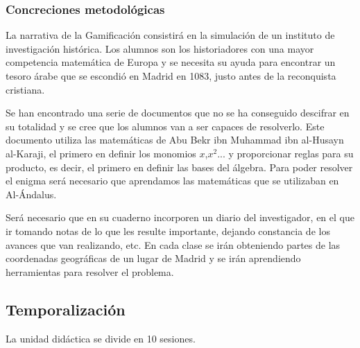 \subsubsection{Concreciones metodológicas}

La narrativa de la Gamificación consistirá en la simulación de un instituto de investigación histórica.
%
Los alumnos son los historiadores con una mayor competencia matemática de Europa y se necesita su ayuda para encontrar un tesoro árabe que se escondió en Madrid en 1083, justo antes de la reconquista cristiana.

Se han encontrado una serie de documentos que no se ha conseguido descifrar en su totalidad y se cree que los alumnos van a ser capaces de resolverlo.
%
%
Este documento utiliza las matemáticas de Abu Bekr ibn Muhammad ibn al-Husayn al-Karaji, el primero en definir los monomios $x$,$x^2$... y proporcionar reglas para su producto, es decir, el primero en definir las bases del álgebra\citep{MatArabe}.
%
Para poder resolver el enigma será necesario que aprendamos las matemáticas que se utilizaban en Al-Ándalus.

Será necesario que en su cuaderno incorporen un diario del investigador, en el que ir tomando notas de lo que les resulte importante, dejando constancia de los avances que van realizando, etc.
%
En cada clase se irán obteniendo partes de las coordenadas geográficas de un lugar de Madrid y se irán aprendiendo herramientas para resolver el problema.




\subsection{Temporalización}

La unidad didáctica se divide en 10 sesiones.

